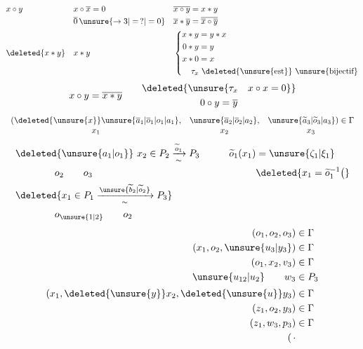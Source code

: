 \[
\begin{aligned}
 &x\circ y &&x\circ \overline{x}=0 &&\overline{x\circ y}=x*y\\
 &&&\overline{0}\,\unsure{\to3|=\,?|=0} &&\overline{x}*\overline{y}=\overline{\overline{x}\circ \overline{y}}\\
 &\deleted{x*y} &&x*y &&
 \left\{\begin{aligned}
 x*y&=y*x\\ 0*y&=y\\x*0&=x\\
 \tau_x&\ \deleted{\unsure{\text{est}}}\ \text{\unsure{bijectif}}
 \end{aligned}\right.
\end{aligned}
\]
\[
 x\circ y=\overline{x*y}\qquad
 \begin{gathered}\deleted{\unsure{\tau_x\quad x\circ x=0}}\\ 0\circ y=\overline{y}\end{gathered}
\]
\[
 \begin{array}{ccc}
 (\deleted{\unsure{x}} \unsure{\overline{a}_1|\overline{o}_1|o_1|a_1},&\unsure{\overline{a}_2|\overline{o}_2|a_2},&\unsure{\widetilde{a}_3|\widetilde{o}_3|a_3})\in \Gamma\\
 x_1&x_2&x_3
 \end{array}
\]
\[
\begin{aligned}
 &\deleted{\unsure{a_1|o_1}}\ x_2\in P_2 \xrightarrow[\sim]{\widetilde o_1}P_3
 &\qquad \widetilde o_1(x_1)&=\unsure{\zeta_1|\xi_1}\\
 &\hspace{4em}o_2\qquad o_3 &&\deleted{x_1=\widetilde o_1^{-1}\bigl(}\\
 &\deleted{x_1\in P_1\xrightarrow[\sim]{\unsure{\widetilde b_2|\widetilde o_2}}P_3}\\
 &\hspace{4em}o_{\unsure{1|2}}\qquad o_2
\end{aligned}
\]
\[
\begin{aligned}
 (o_1,o_2,o_3)&\in \Gamma\\
 (x_1,o_2,\unsure{u_3|y_3})&\in \Gamma\\
 (o_1,x_2,v_3)&\in \Gamma\\
 \unsure{u_{12}|u_2}\qquad w_3&\in P_3\\[2pt]
 (x_1,\deleted{\unsure{y}}x_2,\deleted{\unsure{u}}y_3)&\in \Gamma\\
 (z_1,o_2,y_3)&\in \Gamma\\
 (z_1,w_3,p_3)&\in \Gamma\\
 (\,\cdot
\end{aligned}
\]
